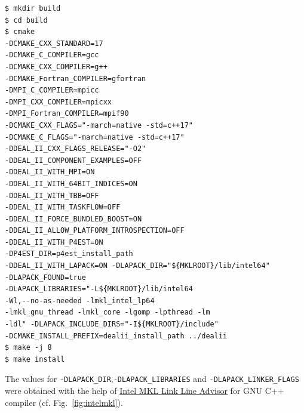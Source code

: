 \begin{verbatim}
$ mkdir build
$ cd build
$ cmake
-DCMAKE_CXX_STANDARD=17
-DCMAKE_C_COMPILER=gcc 
-DCMAKE_CXX_COMPILER=g++
-DCMAKE_Fortran_COMPILER=gfortran
-DMPI_C_COMPILER=mpicc 
-DMPI_CXX_COMPILER=mpicxx 
-DMPI_Fortran_COMPILER=mpif90
-DCMAKE_CXX_FLAGS="-march=native -std=c++17"
-DCMAKE_C_FLAGS="-march=native -std=c++17"
-DDEAL_II_CXX_FLAGS_RELEASE="-O2"
-DDEAL_II_COMPONENT_EXAMPLES=OFF
-DDEAL_II_WITH_MPI=ON
-DDEAL_II_WITH_64BIT_INDICES=ON
-DDEAL_II_WITH_TBB=OFF
-DDEAL_II_WITH_TASKFLOW=OFF 
-DDEAL_II_FORCE_BUNDLED_BOOST=ON
-DDEAL_II_ALLOW_PLATFORM_INTROSPECTION=OFF
-DDEAL_II_WITH_P4EST=ON 
-DP4EST_DIR=p4est_install_path 
-DDEAL_II_WITH_LAPACK=ON -DLAPACK_DIR="${MKLROOT}/lib/intel64"
-DLAPACK_FOUND=true
-DLAPACK_LIBRARIES="-L${MKLROOT}/lib/intel64
-Wl,--no-as-needed -lmkl_intel_lp64
-lmkl_gnu_thread -lmkl_core -lgomp -lpthread -lm
-ldl" -DLAPACK_INCLUDE_DIRS="-I${MKLROOT}/include" 
-DCMAKE_INSTALL_PREFIX=dealii_install_path ../dealii
$ make -j 8
$ make install
\end{verbatim}
The values for \verb|-DLAPACK_DIR|,\verb|-DLAPACK_LIBRARIES| and \verb|-DLAPACK_LINKER_FLAGS| were obtained with the help of \href{https://software.intel.com/en-us/articles/intel-mkl-link-line-advisor}{Intel MKL Link Line Advisor} for GNU C++ compiler (cf. Fig.~\ref{fig:intelmkl}).\\ 
